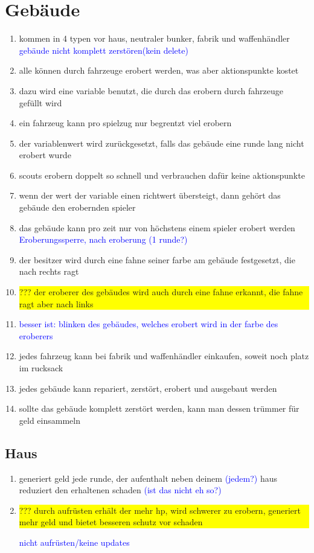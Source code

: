 \documentclass[10pt,a4paper,final]{scrartcl}
\newcommand{\ueberdenken}[1]{\colorbox{yellow}{\parbox{\textwidth}{??? #1}}}
\newcommand{\notiz}[1]{\textcolor{blue}{#1}}
\begin{document}
\section{Gebäude}
\begin{enumerate}
\item kommen in 4 typen vor haus, neutraler bunker, fabrik und waffenhändler \notiz{gebäude nicht komplett zerstören(kein delete)}
\item alle können durch fahrzeuge erobert werden, was aber aktionspunkte kostet
\item dazu wird eine variable benutzt, die durch das erobern durch fahrzeuge gefüllt wird 
\item ein fahrzeug kann pro spielzug nur begrentzt viel erobern
\item der variablenwert wird zurückgesetzt, falls das gebäude eine runde lang nicht erobert wurde
\item scouts erobern doppelt so schnell und verbrauchen dafür keine aktionspunkte
\item wenn der wert der variable einen richtwert übersteigt, dann gehört das gebäude den erobernden spieler
\item das gebäude kann pro zeit nur von höchstens einem spieler erobert werden \notiz{Eroberungssperre, nach eroberung (1 runde?)}
\item der besitzer wird durch eine fahne seiner farbe am gebäude festgesetzt, die nach rechts ragt
\item \ueberdenken{der eroberer des gebäudes wird auch durch eine fahne erkannt, die fahne ragt aber nach links}
\item \notiz{besser ist: blinken des gebäudes, welches erobert wird in der farbe des eroberers}
\item jedes fahrzeug kann bei fabrik und waffenhändler einkaufen, soweit noch platz im rucksack
\item jedes gebäude kann repariert, zerstört, erobert und ausgebaut werden
\item sollte das gebäude komplett zerstört werden, kann man dessen trümmer für geld einsammeln
\end{enumerate}

\subsection{Haus}
\begin{enumerate}
\item generiert geld jede runde, der aufenthalt neben deinem \notiz{(jedem?)} haus reduziert den erhaltenen schaden
\notiz{(ist das nicht eh so?)}
\item \ueberdenken{durch aufrüsten erhält der mehr hp, wird schwerer zu erobern, generiert mehr geld
und bietet besseren schutz vor schaden} \notiz{nicht aufrüsten/keine updates}
\end{enumerate}
\end{document}
